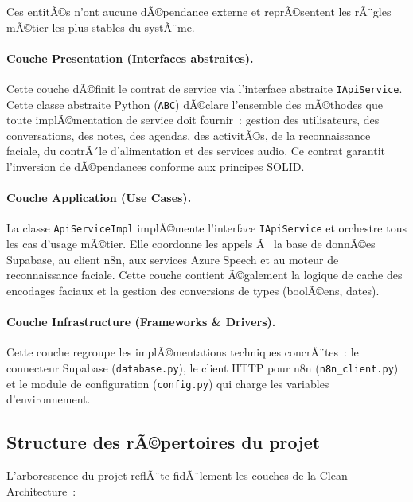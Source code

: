 Ces entitÃ©s n'ont aucune dÃ©pendance externe et reprÃ©sentent les
rÃ¨gles mÃ©tier les plus stables du systÃ¨me.

\paragraph{Couche Presentation (Interfaces abstraites).}
Cette couche dÃ©finit le contrat de service via l'interface abstraite
\texttt{IApiService}. Cette classe abstraite Python (\texttt{ABC})
dÃ©clare l'ensemble des mÃ©thodes que toute implÃ©mentation de service
doit fournir~: gestion des utilisateurs, des conversations, des
notes, des agendas, des activitÃ©s, de la reconnaissance faciale,
du contrÃ´le d'alimentation et des services audio. Ce contrat
garantit l'inversion de dÃ©pendances conforme aux principes SOLID.

\paragraph{Couche Application (Use Cases).}
La classe \texttt{ApiServiceImpl} implÃ©mente l'interface
\texttt{IApiService} et orchestre tous les cas d'usage mÃ©tier.
Elle coordonne les appels Ã  la base de donnÃ©es Supabase, au client
n8n, aux services Azure Speech et au moteur de reconnaissance
faciale. Cette couche contient Ã©galement la logique de cache
des encodages faciaux et la gestion des conversions de types
(boolÃ©ens, dates).

\paragraph{Couche Infrastructure (Frameworks \& Drivers).}
Cette couche regroupe les implÃ©mentations techniques concrÃ¨tes~:
le connecteur Supabase (\texttt{database.py}), le client HTTP
pour n8n (\texttt{n8n\_client.py}) et le module de configuration
(\texttt{config.py}) qui charge les variables d'environnement.

\subsection{Structure des rÃ©pertoires du projet}

L'arborescence du projet reflÃ¨te fidÃ¨lement les couches de la
Clean Architecture~:

